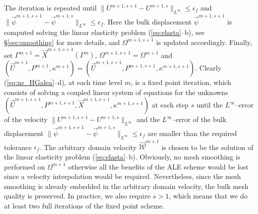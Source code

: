 \documentclass[a4paper,12pt,onecolumn]{article}
\newcommand{\W}{\vec{\mathcal W}}
\begin{document}
The iteration is repeated until $\|U^{m+1,s+1}-U^{m+1,s}\|_{L^\infty}
\leq\epsilon_f$ and $\|\vec \psi^{m+1,s+1}-\vec \psi^{m+1,s}\|_{L^\infty}
\leq\epsilon_f$. Here the bulk displacement $\vec \psi^{m+1,s+1}$ is computed
solving the linear elasticity problem (\ref{eq:elasta}--b), see
\S\ref{sec:smoothing} for more details, and $\Omega^{m+1,s+1}$ is
updated accordingly. Finally, set
$\Gamma^{m+1} = \vec X^{m+1,s+1}(\Gamma^m)$, $\Omega^{m+1,s+1}=\Omega^{m+1}$
and $(\vec U^{m+1}, P^{m+1}, \kappa^{m+1}) = (\vec U^{m+1,s+1}, P^{m+1,s+1},
\kappa^{m+1,s+1})$. Clearly (\ref{eq:ns_HGalea}--d), at each time level $m$, is
a fixed point iteration, which consists of solving a coupled linear system of
equations for the unknowns $(\vec U^{m+1,s+1}, P^{m+1,s+1}, \vec X^{m+1,s+1},
\kappa^{m+1,s+1})$ at each step $s$ until the $L^\infty$--error of the
velocity $\|U^{m+1,s+1}-U^{m+1,s} \|_{L^\infty}$ and the $L^\infty$--error of
the bulk displacement $\|\vec \psi^{m+1,s+1}-\vec \psi^{m+1,s}\|_{L^\infty}
\leq\epsilon_f$ are smaller than the required tolerance $\epsilon_f$. The
arbitrary domain velocity $\W^{m+1}$ is chosen to be the solution of the linear
elasticity problem (\ref{eq:elasta}--b). Obviously, no mesh smoothing is
performed on $\Omega^{m+1}$ otherwise all the benefits of the ALE scheme would
be lost since a velocity interpolation would be required. Nevertheless, since
the mesh smoothing is already embedded in the arbitrary domain velocity, the
bulk mesh quality is preserved. In practice, we also require $s>1$, which means
that we do at least two full iterations of the fixed point scheme.
\end{document}
